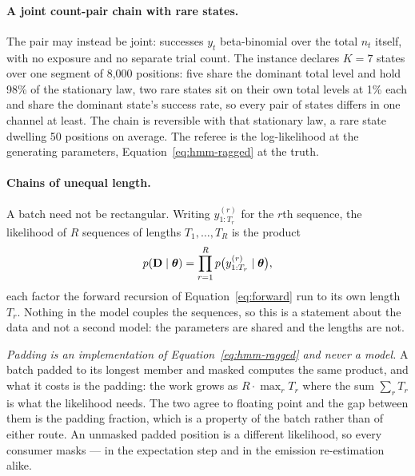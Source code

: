 \documentclass[11pt,a4paper]{article}
\begin{document}
\paragraph{A joint count-pair chain with rare states.}
\label{par:hmm:joint-counts}
The pair may instead be joint: successes $y_t$ beta-binomial over the total
$n_t$ itself, with no exposure and no separate trial count. The instance
declares $K = 7$ states over one segment of 8,000 positions: five share the
dominant total level and hold 98\% of the stationary law, two rare states sit
on their own total levels at 1\% each and share the dominant state's success
rate, so every pair of states differs in one channel at least. The chain is
reversible with that stationary law, a rare state dwelling 50 positions on
average. The referee is the log-likelihood at the generating parameters,
Equation~\ref{eq:hmm-ragged} at the truth.

\paragraph{Chains of unequal length.}
\label{par:hmm:ragged}
A batch need not be rectangular. Writing $y^{(r)}_{1:T_r}$ for the $r$th
sequence, the likelihood of $R$ sequences of lengths $T_1, \dots, T_R$ is the
product
\begin{equation}
  p(\mathbf{D} \mid \boldsymbol{\theta})
    = \prod_{r=1}^{R} p\big(y^{(r)}_{1:T_r} \mid \boldsymbol{\theta}\big),
  \label{eq:hmm-ragged}
\end{equation}
each factor the forward recursion of Equation~\ref{eq:forward} run to its own
length $T_r$. Nothing in the model couples the sequences, so this is a statement
about the data and not a second model: the parameters are shared and the
lengths are not.

\emph{Padding is an implementation of Equation~\ref{eq:hmm-ragged} and never
a model.} A batch padded to its longest member and masked computes the same
product, and what it costs is the padding: the work grows as
$R \cdot \max_r T_r$ where the sum $\sum_r T_r$ is what the likelihood needs.
The two agree to floating point and the gap between them is the padding
fraction, which is a property of the batch rather than of either route. An
unmasked padded position is a different likelihood, so every consumer masks
--- in the expectation step and in the emission re-estimation alike.
\end{document}

